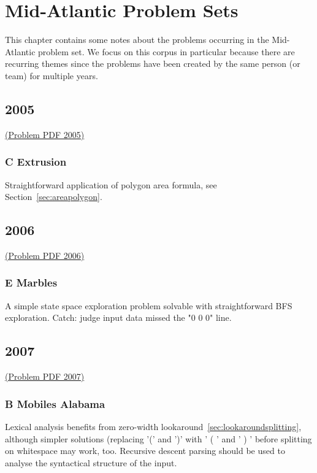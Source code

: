 \chapter{Mid-Atlantic Problem Sets}

This chapter contains some notes about the problems occurring in the Mid-Atlantic
problem set.  We focus on this corpus in particular because there are recurring
themes since the problems have been created by the same person (or team) for
multiple years.

\section{2005}

\href{http://midatl.radford.edu/docs/pastProblems/05contest/MidAtlantic2005.pdf}{(Problem PDF 2005)}

\subsection{C Extrusion}
\label{sec:2005-c-extrusion}

Straightforward application of polygon area formula, see Section~\ref{sec:areapolygon}.

\section{2006}
\href{http://midatl.radford.edu/docs/pastProblems/06contest/MidAtlantic2006.pdf}{(Problem PDF 2006)}

\subsection{E Marbles}
\label{sec:2006-e-marbles}
A simple state space exploration problem solvable with straightforward BFS exploration.
Catch: judge input data missed the "0 0 0" line.

\section{2007}
\href{http://midatl.radford.edu/docs/pastProblems/07contest/MidAtlantic2007.pdf}{(Problem PDF 2007)}

\subsection{B Mobiles Alabama}
\label{sec:2007-b-mobile}

Lexical analysis benefits from zero-width lookaround~\ref{sec:lookaroundsplitting}, although
simpler solutions (replacing '(' and ')' with ' ( ' and ' ) ' before splitting on whitespace
may work, too.
Recursive descent parsing should be used to analyse the syntactical structure of the input.

